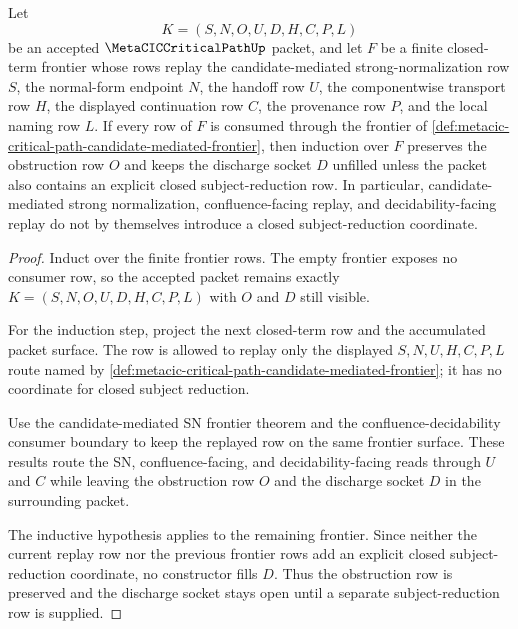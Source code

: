 \begin{theorem}
\label{thm:metacic-critical-path-discharge-socket-induction}
Let
$$
K=(S,N,O,U,D,H,C,P,L)
$$
be an accepted $\MetaCICCriticalPathUp$ packet, and let $F$ be a finite closed-term frontier whose rows replay the candidate-mediated strong-normalization row $S$, the normal-form endpoint $N$, the handoff row $U$, the componentwise transport row $H$, the displayed continuation row $C$, the provenance row $P$, and the local naming row $L$. If every row of $F$ is consumed through the frontier of \autoref{def:metacic-critical-path-candidate-mediated-frontier}, then induction over $F$ preserves the obstruction row $O$ and keeps the discharge socket $D$ unfilled unless the packet also contains an explicit closed subject-reduction row. In particular, candidate-mediated strong normalization, confluence-facing replay, and decidability-facing replay do not by themselves introduce a closed subject-reduction coordinate.
\end{theorem}
\begin{proof}
Induct over the finite frontier rows. The empty frontier exposes no consumer row, so the accepted packet remains exactly $K=(S,N,O,U,D,H,C,P,L)$ with $O$ and $D$ still visible.

For the induction step, project the next closed-term row and the accumulated packet surface. The row is allowed to replay only the displayed $S,N,U,H,C,P,L$ route named by \autoref{def:metacic-critical-path-candidate-mediated-frontier}; it has no coordinate for closed subject reduction.

Use the candidate-mediated SN frontier theorem and the confluence-decidability consumer boundary to keep the replayed row on the same frontier surface. These results route the SN, confluence-facing, and decidability-facing reads through $U$ and $C$ while leaving the obstruction row $O$ and the discharge socket $D$ in the surrounding packet.

The inductive hypothesis applies to the remaining frontier. Since neither the current replay row nor the previous frontier rows add an explicit closed subject-reduction coordinate, no constructor fills $D$. Thus the obstruction row is preserved and the discharge socket stays open until a separate subject-reduction row is supplied.
\end{proof}

